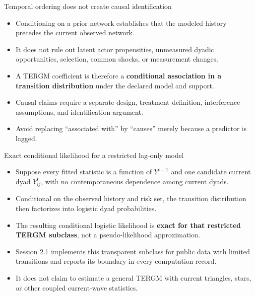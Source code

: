\documentclass[aspectratio=169,11pt]{beamer}
\newcommand{\term}[1]{\textbf{\color{nupurple}#1}}
\begin{document}
\begin{frame}{Temporal ordering does not create causal identification}
\begin{itemize}
\item Conditioning on a prior network establishes that the modeled history precedes the current observed network.
\item It does not rule out latent actor propensities, unmeasured dyadic opportunities, selection, common shocks, or measurement changes.
\item A TERGM coefficient is therefore a \term{conditional association in a transition distribution} under the declared model and support.
\item Causal claims require a separate design, treatment definition, interference assumptions, and identification argument.
\item Avoid replacing ``associated with'' by ``causes'' merely because a predictor is lagged.
\end{itemize}
\end{frame}

\begin{frame}{Exact conditional likelihood for a restricted lag-only model}
\begin{itemize}
\item Suppose every fitted statistic is a function of $Y^{t-1}$ and one candidate current dyad $Y_{ij}^{t}$, with no contemporaneous dependence among current dyads.
\item Conditional on the observed history and risk set, the transition distribution then factorizes into logistic dyad probabilities.
\item The resulting conditional logistic likelihood is \term{exact for that restricted TERGM subclass}, not a pseudo-likelihood approximation.
\item Session 2.1 implements this transparent subclass for public data with limited transitions and reports its boundary in every computation record.
\item It does not claim to estimate a general TERGM with current triangles, stars, or other coupled current-wave statistics.
\end{itemize}
\end{frame}
\end{document}
